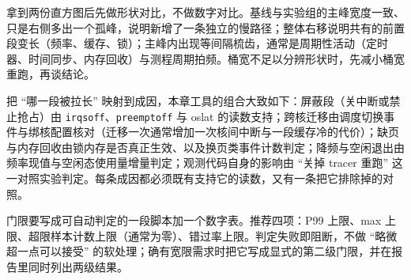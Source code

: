 \documentclass[12pt,a4paper,fontset=fandol]{ctexbook}
\newcommand{\Tp}[1]{\texttt{#1}}
\begin{document}
拿到两份直方图后先做形状对比，不做数字对比。基线与实验组的主峰宽度一致、只是右侧多出一个孤峰，说明新增了一条独立的慢路径；整体右移说明共有的前置段变长（频率、缓存、锁）；主峰内出现等间隔梳齿，通常是周期性活动（定时器、时间同步、内存回收）与测程周期拍频。桶宽不足以分辨形状时，先减小桶宽重跑，再谈结论。

把 ``哪一段被拉长'' 映射到成因，本章工具的组合大致如下：屏蔽段（关中断或禁止抢占）由 \Tp{irqsoff}、\Tp{preemptoff} 与 oslat 的读数支持；跨核迁移由调度切换事件与绑核配置核对（迁移一次通常增加一次核间中断与一段缓存冷的代价）；缺页与内存回收由锁内存是否真正生效、以及换页类事件计数判定；降频与空闲退出由频率现值与空闲态使用量增量判定；观测代码自身的影响由 ``关掉 tracer 重跑'' 这一对照实验判定。每条成因都必须既有支持它的读数，又有一条把它排除掉的对照。

门限要写成可自动判定的一段脚本加一个数字表。推荐四项：P99 上限、max 上限、超限样本计数上限（通常为零）、错过率上限。判定失败即阻断，不做 ``略微超一点可以接受'' 的软处理；确有宽限需求时把它写成显式的第二级门限，并在报告里同时列出两级结果。
\end{document}
